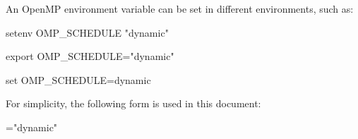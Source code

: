 \newpage
An OpenMP environment variable can be set in different environments, such as:

\begin{boxedcode}
setenv OMP_SCHEDULE "dynamic"
\end{boxedcode}

\begin{boxedcode}
export OMP_SCHEDULE="dynamic"
\end{boxedcode}

\begin{boxedcode}
set OMP_SCHEDULE=dynamic
\end{boxedcode}

For simplicity, the following form is used in this document:
\begin{boxeducode}
="dynamic"
\end{boxeducode}


